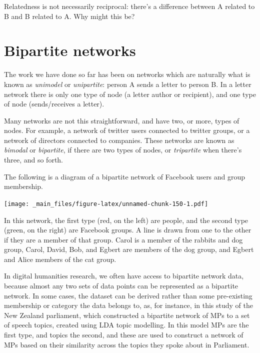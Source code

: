 \documentclass[
]{book}
\begin{document}
Relatedness is not necessarily reciprocal: there's a difference between A related to B and B related to A. Why might this be?

\hypertarget{bipartite-networks-1}{%
\section{Bipartite networks}\label{bipartite-networks-1}}

The work we have done so far has been on networks which are naturally what is known as \emph{unimodel} or \emph{unipartite}: person A sends a letter to person B. In a letter network there is only one type of node (a letter author or recipient), and one type of node (sends/receives a letter).

Many networks are not this straightforward, and have two, or more, types of nodes. For example, a network of twitter users connected to twitter groups, or a network of directors connected to companies. These networks are known as \emph{bimodal} or \emph{bipartite}, if there are two types of nodes, or \emph{tripartite} when there's three, and so forth.

The following is a diagram of a bipartite network of Facebook users and group membership.

\texttt{[image: \_main\_files/figure-latex/unnamed-chunk-150-1.pdf]}

In this network, the first type (red, on the left) are people, and the second type (green, on the right) are Facebook groups. A line is drawn from one to the other if they are a member of that group. Carol is a member of the rabbits and dog group, Carol, David, Bob, and Egbert are members of the dog group, and Egbert and Alice members of the cat group.

In digital humanities research, we often have access to bipartite network data, because almost any two sets of data points can be represented as a bipartite network. In some cases, the dataset can be derived rather than some pre-existing membership or category the data belongs to, as, for instance, in this study of the New Zealand parliament, which constructed a bipartite network of MPs to a set of speech topics, created using LDA topic modelling. In this model MPs are the first type, and topics the second, and these are used to construct a network of MPs based on their similarity across the topics they spoke about in Parliament.
\end{document}
